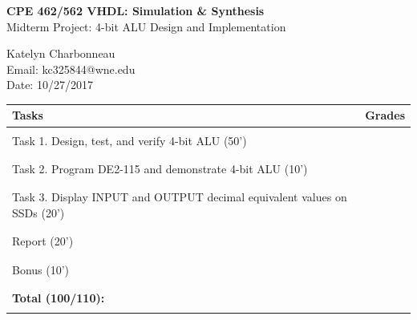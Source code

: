\documentclass[12pt]{article}
\begin{document}
\begin{figure}[htb]
\hfil \hspace{.5in}
\end{figure}

\begin{center}
{\Large {\bf CPE 462/562 VHDL: Simulation \& Synthesis}}\\
\vspace{0.2in}
{\Large{Midterm Project: 4-bit ALU Design and Implementation}} \\
\vspace{0.2in}

Katelyn Charbonneau\\
Email: kc325844@wne.edu\\
Date: 10/27/2017\\
\end{center}

\begin{table}[!h]
\centering
\begin{tabular}{| >{\arraybackslash}m{4in} | >{\centering\arraybackslash}m{1in} | }
  \hline
  \textbf{Tasks} & \textbf{Grades} \\
  \hline
  &\\
  Task 1. Design, test, and verify 4-bit ALU (50') & \\
  &\\
  \hline
  &\\
  Task 2. Program DE2-115 and demonstrate 4-bit ALU (10') & \\
  &\\
  \hline
  &\\
  Task 3. Display INPUT and OUTPUT decimal equivalent values on SSDs (20') & \\
  &\\
  \hline
  &\\
  Report (20') & \\
  &\\
  \hline
    &\\
  Bonus (10') & \\
  &\\
  \hline
  \hline
    &\\
  \textbf{Total (100/110):} & \\
  &\\
  \hline

\end{tabular}
\label{table_cover}
\end{table}
\end{document}
